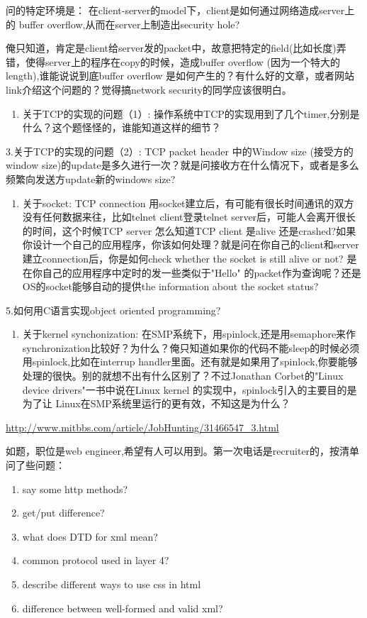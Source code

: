 \documentclass[12pt]{book}
\begin{document}
问的特定环境是： 在client-server的model下，client是如何通过网络造成server上的 buffer overflow,从而在server上制造出security hole?

俺只知道，肯定是client给server发的packet中，故意把特定的field(比如长度)弄错，使得server上的程序在copy的时候，造成buffer overflow (因为一个特大的length),谁能说说到底buffer overflow 是如何产生的？有什么好的文章，或者网站link介绍这个问题的？觉得搞network security的同学应该很明白。

\begin{enumerate}
\item 关于TCP的实现的问题（1）: 操作系统中TCP的实现用到了几个timer,分别是什么？这个题怪怪的，谁能知道这样的细节？
\end{enumerate}

3.关于TCP的实现的问题（2）: TCP packet header 中的Window size (接受方的 window size)的update是多久进行一次？就是问接收方在什么情况下，或者是多么频繁向发送方update新的windows size?

\begin{enumerate}
\item 关于socket: TCP connection 用socket建立后，有可能有很长时间通讯的双方没有任何数据来往，比如telnet client登录telnet server后，可能人会离开很长的时间，这个时候TCP server 怎么知道TCP client 是alive 还是crashed?如果你设计一个自己的应用程序，你该如何处理？就是问在你自己的client和server建立connection后，你是如何check whether the socket is still alive or not? 是在你自己的应用程序中定时的发一些类似于"Hello" 的packet作为查询呢？还是OS的socket能够自动的提供the information about the socket status?
\end{enumerate}

5.如何用C语言实现object oriented programming?

\begin{enumerate}
\item 关于kernel synchonization: 在SMP系统下，用spinlock,还是用semaphore来作synchronization比较好？为什么？俺只知道如果你的代码不能sleep的时候必须用spinlock,比如在interrup handler里面。还有就是如果用了spinlock,你要能够处理的很快。别的就想不出有什么区别了？不过Jonathan Corbet的"Linux device drivers"一书中说在Linux kernel 的实现中，spinlock引入的主要目的是为了让 Linux在SMP系统里运行的更有效，不知这是为什么？
\end{enumerate}

\url{http://www.mitbbs.com/article/JobHunting/31466547_3.html}

如题，职位是web engineer,希望有人可以用到。第一次电话是recruiter的，按清单问了些问题：
\begin{enumerate}
\item say some http methods?
\item get/put difference?
\item what does DTD for xml mean?
\item common protocol used in layer 4?
\item describe different ways to use css in html
\item difference between well-formed and valid xml?
\end{enumerate}
\end{document}
